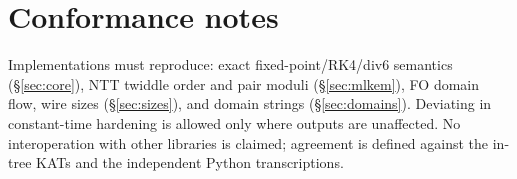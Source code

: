 \documentclass[11pt,a4paper]{article}
\begin{document}
\section{Conformance notes}

Implementations must reproduce: exact fixed-point/RK4/div6 semantics
(\S\ref{sec:core}), NTT twiddle order and pair moduli (\S\ref{sec:mlkem}), FO
domain flow, wire sizes (\S\ref{sec:sizes}), and domain strings
(\S\ref{sec:domains}). Deviating in constant-time hardening is allowed only where
outputs are unaffected. No interoperation with other libraries is claimed;
agreement is defined against the in-tree KATs and the independent Python
transcriptions.
\end{document}
